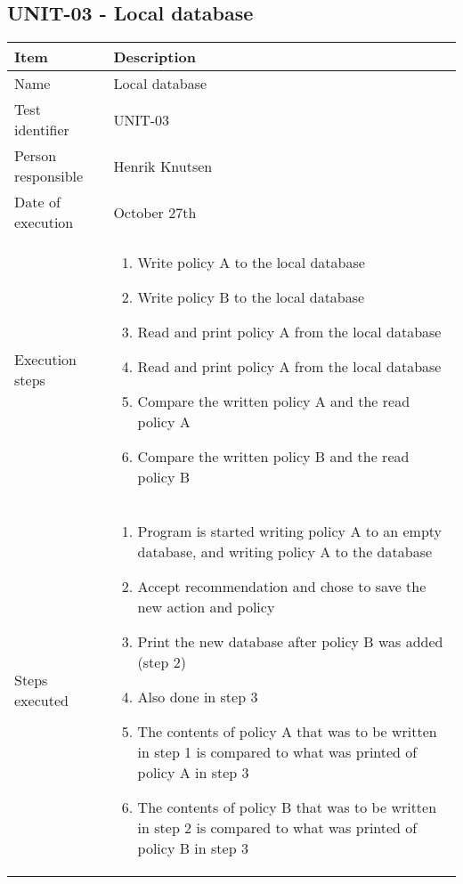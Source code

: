 \documentclass[a4paper]{article}
\begin{document}
\subsection{UNIT-03 - Local database}
		\begin{center}
		\begin{tabular}{ |  p{3cm} | p{7cm} | }
			\hline
			Item & Description \\ [5pt] \hline \hline
			Name & Local database \\  [5pt] \hline
			Test identifier & UNIT-03 \\  [5pt] \hline
			Person responsible & Henrik Knutsen \\  [5pt] \hline
			Date of execution & October 27th \\  [5pt] \hline

			Execution steps & 	\begin{enumerate}
							\item Write policy A to the local database
							\item Write policy B to the local database
							\item Read and print policy A from the local database
							\item Read and print policy A from the local database
							\item Compare the written policy A and the read policy A
							\item Compare the written policy B and the read policy B
						\end{enumerate} \\ [5pt] \hline

			Steps executed & 	\begin{enumerate}
							\item Program is started writing policy A to an empty database, and writing policy A to the database
							\item Accept recommendation and chose to save the new action and policy
							\item Print the new database after policy B was added (step 2)
							\item Also done in step 3
							\item The contents of policy A that was to be written in step 1 is compared to what was printed of policy A in step 3
							\item The contents of policy B that was to be written in step 2 is compared to what was printed of policy B in step 3
						\end{enumerate} \\ [5pt] \hline
			

\end{tabular}
\end{center}
\end{document}
